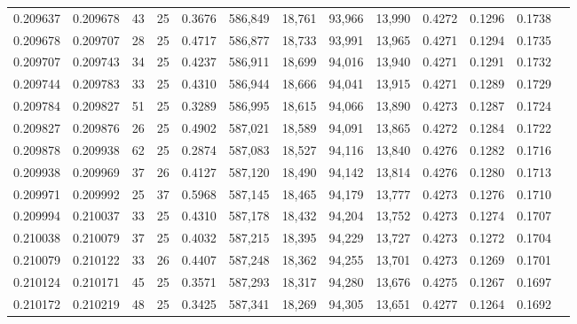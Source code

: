 \begin{tabular}{rrrrrrrrrrrrr}
0.209637 & 0.209678 &  43 &  25 &                                     0.3676 & 586,849 &  18,761 &  93,966 &  13,990 & 0.4272 & 0.1296 & 0.1738 \\
0.209678 & 0.209707 &  28 &  25 &                                     0.4717 & 586,877 &  18,733 &  93,991 &  13,965 & 0.4271 & 0.1294 & 0.1735 \\
0.209707 & 0.209743 &  34 &  25 &                                     0.4237 & 586,911 &  18,699 &  94,016 &  13,940 & 0.4271 & 0.1291 & 0.1732 \\
0.209744 & 0.209783 &  33 &  25 &                                     0.4310 & 586,944 &  18,666 &  94,041 &  13,915 & 0.4271 & 0.1289 & 0.1729 \\
0.209784 & 0.209827 &  51 &  25 &                                     0.3289 & 586,995 &  18,615 &  94,066 &  13,890 & 0.4273 & 0.1287 & 0.1724 \\
0.209827 & 0.209876 &  26 &  25 &                                     0.4902 & 587,021 &  18,589 &  94,091 &  13,865 & 0.4272 & 0.1284 & 0.1722 \\
0.209878 & 0.209938 &  62 &  25 &                                     0.2874 & 587,083 &  18,527 &  94,116 &  13,840 & 0.4276 & 0.1282 & 0.1716 \\
0.209938 & 0.209969 &  37 &  26 &                                     0.4127 & 587,120 &  18,490 &  94,142 &  13,814 & 0.4276 & 0.1280 & 0.1713 \\
0.209971 & 0.209992 &  25 &  37 &                                     0.5968 & 587,145 &  18,465 &  94,179 &  13,777 & 0.4273 & 0.1276 & 0.1710 \\
0.209994 & 0.210037 &  33 &  25 &                                     0.4310 & 587,178 &  18,432 &  94,204 &  13,752 & 0.4273 & 0.1274 & 0.1707 \\
0.210038 & 0.210079 &  37 &  25 &                                     0.4032 & 587,215 &  18,395 &  94,229 &  13,727 & 0.4273 & 0.1272 & 0.1704 \\
0.210079 & 0.210122 &  33 &  26 &                                     0.4407 & 587,248 &  18,362 &  94,255 &  13,701 & 0.4273 & 0.1269 & 0.1701 \\
0.210124 & 0.210171 &  45 &  25 &                                     0.3571 & 587,293 &  18,317 &  94,280 &  13,676 & 0.4275 & 0.1267 & 0.1697 \\
0.210172 & 0.210219 &  48 &  25 &                                     0.3425 & 587,341 &  18,269 &  94,305 &  13,651 & 0.4277 & 0.1264 & 0.1692 \\

\end{tabular}
